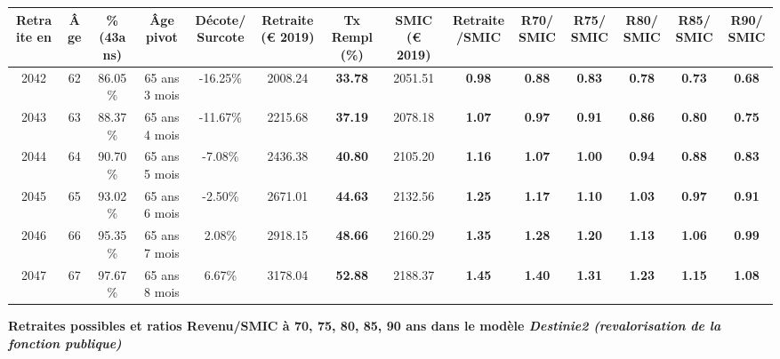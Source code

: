\begin{adjustbox}{max width=\textwidth} 
\begin{tabular}[htb]{|c|c||c|c|c||c|c||c|c||c|c|c|c|c|} 
\hline 
 Retraite en &  Âge &  \%(43ans) &  Âge pivot &  Décote/Surcote &  Retraite (\euro{} 2019) &  Tx Rempl(\%) &  SMIC (\euro{} 2019) &  Retraite/SMIC &  R70/SMIC &  R75/SMIC &  R80/SMIC &  R85/SMIC &  R90/SMIC \\ 
\hline \hline 
 2042 &  62 &  86.05\% &  65 ans 3 mois &  -16.25\% &  2008.24 &  {\bf 33.78} &  2051.51 &  {\bf {\color{red} 0.98}} &  {\bf {\color{red} 0.88}} &  {\bf {\color{red} 0.83}} &  {\bf {\color{red} 0.78}} &  {\bf {\color{red} 0.73}} &  {\bf {\color{red} 0.68}} \\ 
\hline 
 2043 &  63 &  88.37\% &  65 ans 4 mois &  -11.67\% &  2215.68 &  {\bf 37.19} &  2078.18 &  {\bf 1.07} &  {\bf {\color{red} 0.97}} &  {\bf {\color{red} 0.91}} &  {\bf {\color{red} 0.86}} &  {\bf {\color{red} 0.80}} &  {\bf {\color{red} 0.75}} \\ 
\hline 
 2044 &  64 &  90.70\% &  65 ans 5 mois &  -7.08\% &  2436.38 &  {\bf 40.80} &  2105.20 &  {\bf 1.16} &  {\bf 1.07} &  {\bf 1.00} &  {\bf {\color{red} 0.94}} &  {\bf {\color{red} 0.88}} &  {\bf {\color{red} 0.83}} \\ 
\hline 
 2045 &  65 &  93.02\% &  65 ans 6 mois &  -2.50\% &  2671.01 &  {\bf 44.63} &  2132.56 &  {\bf 1.25} &  {\bf 1.17} &  {\bf 1.10} &  {\bf 1.03} &  {\bf {\color{red} 0.97}} &  {\bf {\color{red} 0.91}} \\ 
\hline 
 2046 &  66 &  95.35\% &  65 ans 7 mois &  2.08\% &  2918.15 &  {\bf 48.66} &  2160.29 &  {\bf 1.35} &  {\bf 1.28} &  {\bf 1.20} &  {\bf 1.13} &  {\bf 1.06} &  {\bf {\color{red} 0.99}} \\ 
\hline 
 2047 &  67 &  97.67\% &  65 ans 8 mois &  6.67\% &  3178.04 &  {\bf 52.88} &  2188.37 &  {\bf 1.45} &  {\bf 1.40} &  {\bf 1.31} &  {\bf 1.23} &  {\bf 1.15} &  {\bf 1.08} \\ 
\hline 
\hline 
\end{tabular} 
\end{adjustbox} 
 
 \vspace{0.1cm} 
{\bf \noindent Retraites possibles et ratios Revenu/SMIC à 70, 75, 80, 85, 90 ans dans le modèle \emph{Destinie2 (revalorisation de la fonction publique)}}  
 
